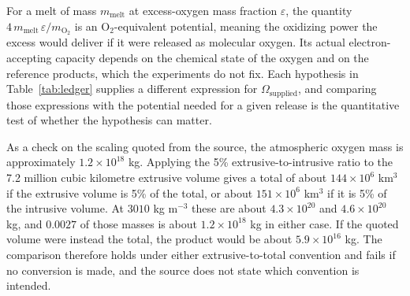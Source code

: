 \documentclass[11pt]{article}
\begin{document}
For a melt of mass $m_{\mathrm{melt}}$ at excess-oxygen mass fraction $\varepsilon$, the quantity $4\,m_{\mathrm{melt}}\,\varepsilon / m_{\mathrm{O_2}}$ is an O$_2$-equivalent potential, meaning the oxidizing power the excess would deliver if it were released as molecular oxygen. Its actual electron-accepting capacity depends on the chemical state of the oxygen and on the reference products, which the experiments do not fix. Each hypothesis in Table~\ref{tab:ledger} supplies a different expression for $\Omega_{\text{supplied}}$, and comparing those expressions with the potential needed for a given release is the quantitative test of whether the hypothesis can matter.

As a check on the scaling quoted from the source, the atmospheric oxygen mass is approximately $1.2 \times 10^{18}$ kg. Applying the 5\% extrusive-to-intrusive ratio to the 7.2 million cubic kilometre extrusive volume gives a total of about $144 \times 10^{6}$ km$^3$ if the extrusive volume is 5\% of the total, or about $151 \times 10^{6}$ km$^3$ if it is 5\% of the intrusive volume. At $3010$ kg m$^{-3}$ these are about $4.3 \times 10^{20}$ and $4.6 \times 10^{20}$ kg, and $0.0027$ of those masses is about $1.2 \times 10^{18}$ kg in either case. If the quoted volume were instead the total, the product would be about $5.9 \times 10^{16}$ kg. The comparison therefore holds under either extrusive-to-total convention and fails if no conversion is made, and the source does not state which convention is intended.
\end{document}
